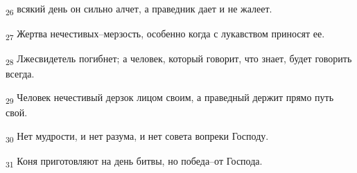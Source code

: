 \begin{tcolorbox}
\textsubscript{26} всякий день он сильно алчет, а праведник дает и не жалеет.
\end{tcolorbox}
\begin{tcolorbox}
\textsubscript{27} Жертва нечестивых--мерзость, особенно когда с лукавством приносят ее.
\end{tcolorbox}
\begin{tcolorbox}
\textsubscript{28} Лжесвидетель погибнет; а человек, который говорит, что знает, будет говорить всегда.
\end{tcolorbox}
\begin{tcolorbox}
\textsubscript{29} Человек нечестивый дерзок лицом своим, а праведный держит прямо путь свой.
\end{tcolorbox}
\begin{tcolorbox}
\textsubscript{30} Нет мудрости, и нет разума, и нет совета вопреки Господу.
\end{tcolorbox}
\begin{tcolorbox}
\textsubscript{31} Коня приготовляют на день битвы, но победа--от Господа.
\end{tcolorbox}
